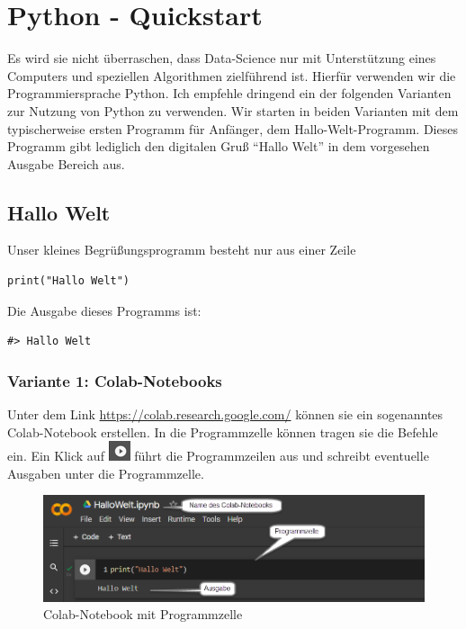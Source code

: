 \documentclass[
  oneside]{book}
\begin{document}
\hypertarget{python---quickstart}{%
\chapter{Python - Quickstart}\label{python---quickstart}}

Es wird sie nicht überraschen, dass Data-Science nur mit Unterstützung eines Computers und speziellen Algorithmen zielführend ist. Hierfür verwenden wir die Programmiersprache Python. Ich empfehle dringend ein der folgenden Varianten zur Nutzung von Python zu verwenden. Wir starten in beiden Varianten mit dem typischerweise ersten Programm für Anfänger, dem Hallo-Welt-Programm. Dieses Programm gibt lediglich den digitalen Gruß ``Hallo Welt'' in dem vorgesehen Ausgabe Bereich aus.

\hypertarget{hallo-welt}{%
\section{Hallo Welt}\label{hallo-welt}}

Unser kleines Begrüßungsprogramm besteht nur aus einer Zeile

\begin{verbatim}
print("Hallo Welt")
\end{verbatim}

Die Ausgabe dieses Programms ist:

\begin{verbatim}
#> Hallo Welt
\end{verbatim}

\hypertarget{variante-1-colab-notebooks}{%
\subsection*{Variante 1: Colab-Notebooks}\label{variante-1-colab-notebooks}}

Unter dem Link \url{https://colab.research.google.com/} können sie ein sogenanntes Colab-Notebook erstellen. In die Programmzelle können tragen sie die Befehle ein. Ein Klick auf \includegraphics{01-python.assets/image-20220220185350019.png} führt die Programmzeilen aus und schreibt eventuelle Ausgaben unter die Programmzelle.

\begin{figure}
\centering
\includegraphics[width=1\textwidth,height=\textheight]{01-python.assets/image-20220220185808467.png}
\caption{Colab-Notebook mit Programmzelle}
\end{figure}
\end{document}
